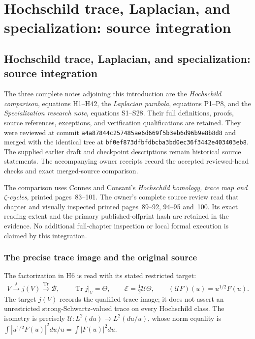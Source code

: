 \begingroup

\section{Hochschild trace, Laplacian, and specialization: source integration}


\subsection{Hochschild trace, Laplacian, and specialization: source integration}
\label{sec:connes-pr27-source-integration}

The three complete notes adjoining this introduction are the
\emph{Hochschild comparison}, equations H1--H42, the
\emph{Laplacian parabola}, equations P1--P8, and the
\emph{Specialization research note}, equations S1--S28.
Their full definitions, proofs, source references, exceptions, and
verification qualifications are retained. They were reviewed at
commit \nolinkurl{a4a87844c257485ae6d669f5b3eb6d96b9e8b8d8}
and merged with the identical tree at
\nolinkurl{bf0ef873dfbfdbcba3bd0ec36f3442e403403eb8}.
The supplied earlier draft and checkpoint descriptions remain historical
source statements. The accompanying owner receipts record the accepted
reviewed-head checks and exact merged-source comparison.

The comparison uses Connes and Consani's
\emph{Hochschild homology, trace map and $\zeta$-cycles},
printed pages~83--101. The owner's complete source review read that
chapter and visually inspected printed pages~89--92, 94--95 and~100.
Its exact reading extent and the primary published-offprint hash are
retained in the evidence. No additional full-chapter inspection or
local formal execution is claimed by this integration.

\subsubsection{The precise trace image and the original source}

The factorization in H6 is read with its stated restricted target:
\[
 V\xrightarrow{j}j(V)\xrightarrow{\operatorname{Tr}}\mathscr B,
 \qquad \operatorname{Tr}j|_V=\Theta,
 \qquad \mathcal E=\tfrac12\mathcal U\Theta,
 \qquad(\mathcal UF)(u)=u^{1/2}F(u).
\]
The target $j(V)$ records the qualified trace image; it does not
assert an unrestricted strong-Schwartz-valued trace on every
Hochschild class. The isometry is precisely
$\mathcal U:L^2(du)\to L^2(du/u)$, whose norm equality is
$\int|u^{1/2}F(u)|^2du/u=\int|F(u)|^2du$.

